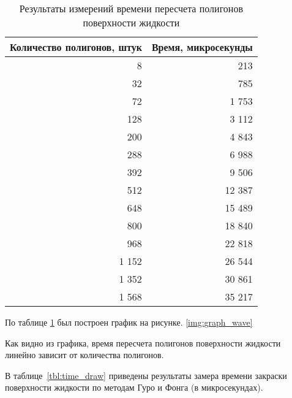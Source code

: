 \begin{table}[H]
\caption{\label{tbl:time}Результаты измерений времени пересчета полигонов поверхности жидкости}
\centering
\begin{tabular}{|r|r|}
\hline
Количество полигонов, штук & Время, микросекунды \\ \hline
8    &    213 \\ \hline
32   &    785 \\ \hline
72   &  1 753 \\ \hline
128  &  3 112 \\ \hline
200  &  4 843 \\ \hline
288  &  6 988 \\ \hline
392  &  9 506 \\ \hline
512  &  12 387 \\ \hline
648  &  15 489 \\ \hline
800  &  18 840 \\ \hline
968  &  22 818 \\ \hline
1 152 &  26 544 \\ \hline
1 352 &  30 861 \\ \hline
1 568 &  35 217 \\ \hline
\end{tabular}
\end{table}

По таблице \ref{tbl:time} был построен график на рисунке. \ref{img:graph_wave}


\newpage

Как видно из графика, время пересчета полигонов поверхности жидкости линейно зависит от количества полигонов.

В таблице~\ref{tbl:time_draw} приведены результаты замера времени закраски поверхности жидкости по методам Гуро и Фонга (в микросекундах). 

